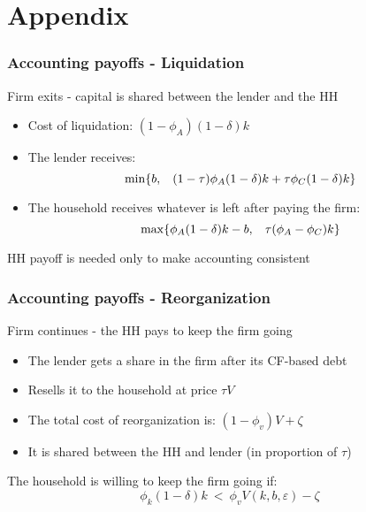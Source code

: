 \documentclass[notes]{beamer}
\begin{document}
\appendix

\section{Appendix}

\begin{frame}\frametitle{Accounting payoffs - Liquidation}
Firm exits - capital is shared between the lender and the HH
\begin{itemize}  \setlength\itemsep{0em}
    \item Cost of liquidation: $(1-\phi_A)(1-\delta)k$
    \item The lender receives:
    \small  $$ \min \{ b, \hspace{3mm} (1-\tau) \phi_A (1-\delta) k + \tau \phi_C (1-\delta) k \} $$ \normalsize
    \item  The household receives whatever is left after paying the firm:
    \small  $$ \max \{\phi_A (1-\delta) k - b, \hspace{3mm} \tau (\phi_A-\phi_C) k  \} $$ \normalsize
    \end{itemize}
 HH payoff is needed only to make accounting consistent
\end{frame}

\begin{frame}\frametitle{Accounting payoffs - Reorganization}
Firm continues - the  HH pays to keep the firm going
\begin{itemize} \setlength\itemsep{0em}
    \item The lender gets a share in the firm after its CF-based debt
    \item Resells it to the household at price $\tau V$
    \item The total cost of reorganization is: $ (1- \phi_v) V + \zeta $ 
    \item It is shared between the HH and lender (in proportion of $\tau$)
\end{itemize}
The household is willing to keep the firm going if: 
$$\phi_k (1-\delta) k  \  < \ \phi_v V(k,b,\varepsilon)- \zeta$$

\end{frame}
\end{document}
